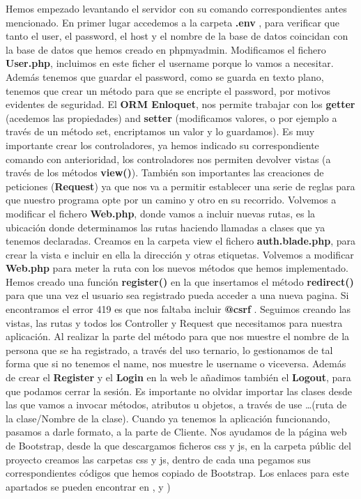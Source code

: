 \documentclass{article}
\begin{document}
\begin{enumerate}
\end{enumerate}

Hemos empezado levantando el servidor con su comando correspondientes antes mencionado.
En primer lugar accedemos a la carpeta \textbf{.env} , para verificar que tanto el user, el password, el host y el nombre de la base de datos coincidan con la base de datos que hemos creado en phpmyadmin.
Modificamos el fichero \textbf{User.php}, incluimos en este ficher el username porque lo vamos a necesitar. Además tenemos que guardar el password, como se guarda en texto plano, tenemos que crear un método para que se encripte el password, por motivos evidentes de seguridad.
El \textbf{ORM Enloquet}, nos permite trabajar con los \textbf{getter} (acedemos las propiedades)  and \textbf{setter} (modificamos valores, o por ejemplo a través de un método set, encriptamos un valor y lo guardamos).
Es muy importante crear los controladores, ya hemos indicado su correspondiente comando con anterioridad, los controladores nos permiten devolver vistas (a través de los métodos \textbf{view()}).
También son importantes las creaciones de peticiones (\textbf{Request}) ya que nos va a permitir establecer una serie de reglas para que nuestro programa opte por un camino y otro en su recorrido.
Volvemos a modificar el fichero \textbf{Web.php}, donde vamos a incluir nuevas rutas, es la ubicación donde determinamos las rutas haciendo llamadas a clases que ya tenemos declaradas.
Creamos en la carpeta view el fichero \textbf{auth.blade.php}, para crear la vista e incluir en ella la dirección y otras etiquetas.
Volvemos a modificar \textbf{Web.php} para meter la ruta con los nuevos métodos que hemos implementado.\\
Hemos creado una función \textbf{register()} en la que insertamos el método \textbf{redirect()} para que una vez el usuario sea registrado pueda acceder a una nueva pagina.
Si encontramos el error 419 es que nos faltaba incluir \textbf{@csrf} .
Seguimos creando las vistas, las rutas y todos los Controller y Request que necesitamos para nuestra aplicación.
Al realizar la parte del método para que nos muestre el nombre de la persona que se ha registrado, a través del uso ternario, lo gestionamos de tal forma que si no tenemos el name, nos muestre le username o viceversa.
Además de crear el \textbf{Register} y el \textbf{Login} en la web le añadimos también el \textbf{Logout}, para que podamos cerrar la sesión.
Es importante no olvidar importar las clases desde las que vamos a invocar métodos, atributos u objetos, a través de  use …(ruta de la clase/Nombre de la clase).
Cuando ya tenemos la aplicación funcionando, pasamos a darle formato, a la parte de Cliente.
Nos ayudamos de la página web de Bootstrap, desde la que descargamos ficheros css y js, en la carpeta públic del proyecto creamos las carpetas css y js, dentro de cada una pegamos sus correspondientes códigos que hemos copiado de Bootstrap. Los enlaces para este apartados se pueden encontrar en \cite{Bootstrap1},\cite{BootstrapNavbar} y \cite{BootstrapAlerts})
\end{document}
